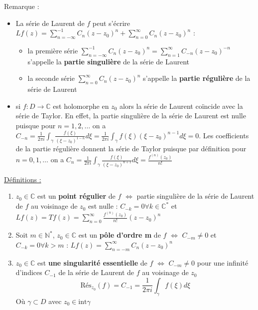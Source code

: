 \documentclass[../main.tex]{subfiles}
\begin{document}
\color{gray} Remarque : \begin{itemize}
    \item La série de Laurent de $f$ peut s'écrire $Lf(z) = \sum_{n=-\infty}^{-1} C_n (z-z_0)^n + \sum_{n=0}^\infty C_n (z-z_0)^n$ : \begin{itemize}
        \item la première série $\sum_{n=-\infty}^{-1} C_n(z-z_0)^n = \sum_{n=1}^\infty C_{-n} (z-z_0)^{-n}$ s'appelle la \textbf{partie singulière} de la série de Laurent\\
        \item la seconde série $\sum_{n=0}^\infty C_n(z-z_0)^n$ s'appelle la \textbf{partie régulière} de la série de Laurent\\
    \end{itemize}
    \item si $f:D\rightarrow \mathbb{C}$ est holomorphe en $z_0$ alors la série de Laurent coïncide avec la série de Taylor. En effet, la partie singulière de la série de Laurent est nulle puisque pour $n=1,2,\dots$ on a $C_{-n} = \frac{1}{2\pi i}\int_\gamma \frac{f(\xi)}{(\xi-z_0)^{1-n}}d\xi = \frac{1}{2\pi i} \int_\gamma f(\xi) (\xi-z_0)^{n-1}d\xi = 0$. Les coefficients de la partie régulière donnent la série de Taylor puisque par définition pour $n=0,1,\dots$ on a $C_n = \frac{1}{2\pi i} \int_\gamma \frac{f(\xi)}{(\xi - z_0)^{n+1}}d\xi = \frac{f^{(n)}(z_0)}{n!}$ \\
\end{itemize}
\color{black}

\quad \underline{Définitions :}\\
\begin{enumerate}
    \item $z_0 \in \mathbb{C}$ est un \textbf{point régulier} de $f$ $\Leftrightarrow$ partie singulière de la série de Laurent de $f$ au voisinage de $z_0$ est nulle : $C_{-k} = 0 \forall k \in \mathbb{C}^*$ et $Lf(z) = Tf(z) = \sum_{n=0}^\infty \frac{f^{(n)}(z_0)}{n!} (z-z_0)^n$\\
    \item Soit $m \in \mathbb{N}^*$, $z_0 \in \mathbb{C}$ est un \textbf{pôle d'ordre m} de $f$ $\Leftrightarrow$ $C_{-m} \neq 0$ et $C_{-k} = 0 \forall k>m$ : $Lf(z) = \sum_{n=-m}^\infty C_n (z-z_0)^n$\\
    \item $z_0 \in \mathbb{C}$ est \textbf{une singularité essentielle} de $f$ $\Leftrightarrow$ $C_{-m} \neq 0$ pour une infinité d'indices $C_{-1}$ de la série de Laurent de $f$ au voisinage de $z_0$ \begin{equation}
        \text{Rés}_{z_0}(f) = C_{-1} = \frac{1}{2\pi i} \int_\gamma f(\xi) d\xi
    \end{equation}
    Où $\gamma \subset D$ avec $z_0 \in \text{int}\gamma$\\
\end{enumerate}
\end{document}
